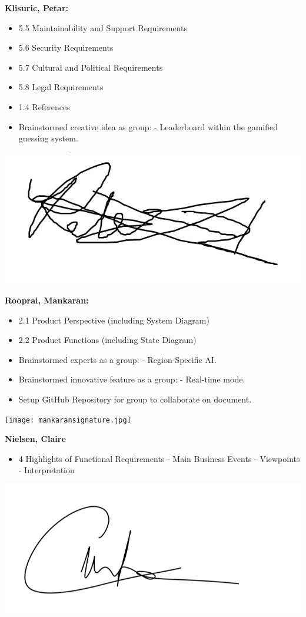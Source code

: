 \documentclass[]{article}
\begin{document}
\textbf{Klisuric, Petar:}
\begin{itemize}
	\item 5.5 Maintainability and Support Requirements
	\item 5.6 Security Requirements
	\item 5.7 Cultural and Political Requirements
	\item 5.8 Legal Requirements
	\item 1.4 References
    \item Brainstormed creative idea as group:
		\subitem - Leaderboard within the gamified guessing system.
\end{itemize}
\includegraphics[scale=0.15]{petarsignature.jpg}

\textbf{Rooprai, Mankaran:}
\begin{itemize}
	\item 2.1 Product Perspective (including System Diagram)
	\item 2.2 Product Functions (including State Diagram)
	\item Brainstormed experts as a group:
		\subitem - Region-Specific AI.
	\item Brainstormed innovative feature as a group:
		\subitem - Real-time mode.
  	\item Setup GitHub Repository for group to collaborate on document.
\end{itemize}
\texttt{[image: mankaransignature.jpg]}

\textbf{Nielsen, Claire}
\begin{itemize}
        \item 4 Highlights of Functional Requirements
            \subitem - Main Business Events
            \subitem - Viewpoints
            \subitem - Interpretation
\end{itemize}
\includegraphics[scale=0.15]{clairesignature.jpg}
\end{document}
